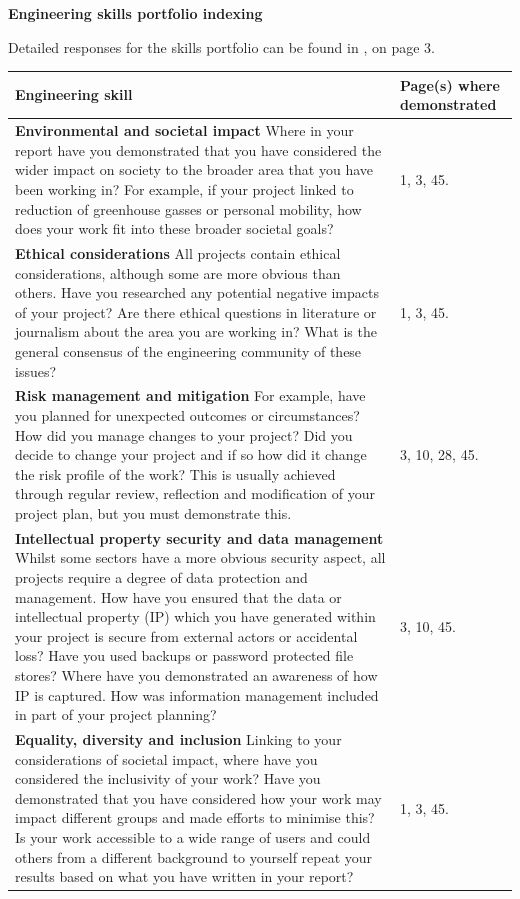 \documentclass[11pt, a4paper]{report}
\begin{document}
\noindent\textbf{Engineering skills portfolio indexing}
\vspace{1em}

Detailed responses for the skills portfolio can be found in , on page 3.


\vspace{1em}
\noindent\begin{tabular}{|p{}|p{}|}
\hline
\textbf{Engineering skill} & \textbf{Page(s) where demonstrated} \\
\hline
\textbf{Environmental and societal impact} Where in your report have you demonstrated that you have considered the wider impact on society to the broader area that you have been working in? For example, if your project linked to reduction of greenhouse gasses or personal mobility, how does your work fit into these broader societal goals? & 1, 3, 45. \\
\hline
\textbf{Ethical considerations} All projects contain ethical considerations, although some are more obvious than others. Have you researched any potential negative impacts of your project? Are there ethical questions in literature or journalism about the area you are working in? What is the general consensus of the engineering community of these issues? & 1, 3, 45.\\
\hline
\textbf{Risk management and mitigation} For example, have you planned for unexpected outcomes or circumstances? How did you manage changes to your project? Did you decide to change your project and if so how did it change the risk profile of the work? This is usually achieved through regular review, reflection and modification of your project plan, but you must demonstrate this. & 3, 10, 28, 45.\\
\hline
\textbf{Intellectual property security and data management} Whilst some sectors have a more obvious security aspect, all projects require a degree of data protection and management. How have you ensured that the data or intellectual property (IP) which you have generated within your project is secure from external actors or accidental loss? Have you used backups or password protected file stores? Where have you demonstrated an awareness of how IP is captured. How was information management included in part of your project planning? & 3, 10, 45.\\
\hline
\textbf{Equality, diversity and inclusion} Linking to your considerations of societal impact, where have you considered the inclusivity of your work? Have you demonstrated that you have considered how your work may impact different groups and made efforts to minimise this? Is your work accessible to a wide range of users and could others from a different background to yourself repeat your results based on what you have written in your report? & 1, 3, 45. \\

\end{tabular}
\end{document}
